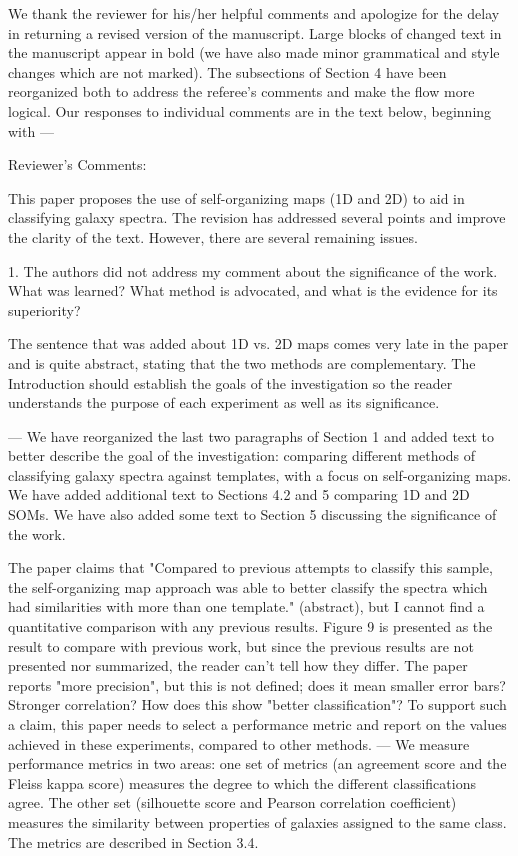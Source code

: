 We thank the reviewer for his/her helpful comments and apologize for the delay in returning a revised version of the manuscript. Large blocks of changed text in the manuscript appear in bold (we have also made minor grammatical and style changes which are not marked). The subsections of Section 4 have been reorganized both to address the referee's comments and make the flow more logical. Our responses to individual comments are in the text below, beginning with ---


Reviewer's Comments:

This paper proposes the use of self-organizing maps (1D and 2D) to aid in classifying galaxy spectra.  The revision has addressed several points and improve the clarity of the text.  However, there are several remaining issues.

1. The authors did not address my comment about the significance of the work.  What was learned?  What method is advocated, and what is the evidence for its superiority?

The sentence that was added about 1D vs. 2D maps comes very late in the paper and is quite abstract, stating that the two methods are complementary.  The Introduction should establish the goals of the investigation so the reader understands the purpose of each experiment as well as its significance.

--- We have reorganized the last two paragraphs of Section 1 and added text to better describe the goal of the investigation: comparing different methods of classifying galaxy spectra against templates, with a focus on self-organizing maps.
We have added additional text to Sections 4.2 and 5 comparing 1D and 2D SOMs.
We have also added some text to Section 5 discussing the significance of the work. 


The paper claims that "Compared to previous attempts to classify this sample, the self-organizing map approach was able to better classify the spectra which had similarities with more than one template." (abstract), but I cannot find a quantitative comparison with any previous results.  Figure 9 is presented as the result to compare with previous work, but since the previous results are not presented nor summarized, the reader can't tell how they differ.  The paper reports "more precision", but this is not defined; does it mean smaller error bars?  Stronger correlation?  How does this show "better classification"?  To support such a claim, this paper needs to select a performance metric and report on the values achieved in these experiments, compared to other methods.
--- We measure performance metrics in two areas: one set of metrics (an agreement score and the Fleiss kappa score) measures the degree to which the different classifications agree. The other set (silhouette score and Pearson correlation coefficient) measures the similarity between properties of galaxies assigned to the same class. The metrics are described in Section 3.4.

